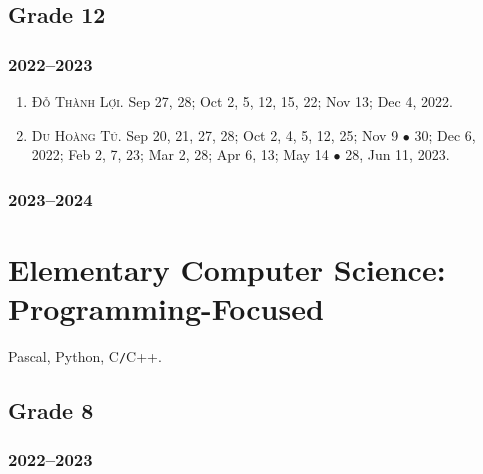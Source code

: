 \documentclass{article}
\begin{document}

\subsection{Grade 12}

\subsubsection{2022--2023}

\begin{enumerate}
	\item \textsc{Đỗ Thành Lợi.} {\sf[In]} Sep 27, 28; Oct 2, 5, 12, 15, 22; Nov 13; Dec 4, 2022. {\sf[Out]}
	\item \textsc{Du Hoàng Tú.} {\sf[In]} Sep 20, 21, 27, 28; Oct 2, 4, 5, 12, 25; Nov 9 $\bullet$ 30; Dec 6, 2022; Feb 2, 7, 23; Mar 2, 28; Apr 6, 13; May 14 $\bullet$ 28, Jun 11, 2023. {\sf[Out]}
\end{enumerate}

\subsubsection{2023--2024}


\section{Elementary Computer Science: Programming-Focused}
Pascal, Python, C\texttt{/}C++.

\subsection{Grade 8}

\subsubsection{2022--2023}
\end{document}

